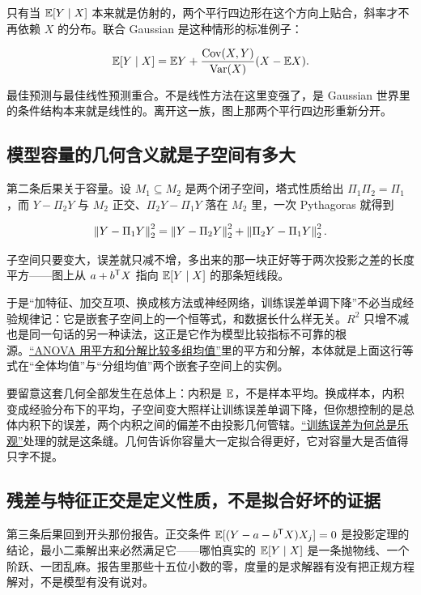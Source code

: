 只有当 \(\mathbb{E}[Y\mid X]\) 本来就是仿射的，两个平行四边形在这个方向上贴合，斜率才不再依赖 \(X\) 的分布。联合 Gaussian 是这种情形的标准例子：

\[
\mathbb{E}[Y\mid X]=\mathbb{E} Y+\frac{\operatorname{Cov}(X,Y)}{\operatorname{Var}(X)}(X-\mathbb{E} X) .
\]

最佳预测与最佳线性预测重合。不是线性方法在这里变强了，是 Gaussian 世界里的条件结构本来就是线性的。离开这一族，图上那两个平行四边形重新分开。

\subsection{模型容量的几何含义就是子空间有多大}

第二条后果关于容量。设 \(M_1\subseteq M_2\) 是两个闭子空间，塔式性质给出 \(\Pi_1\Pi_2=\Pi_1\)，而 \(Y-\Pi_2Y\) 与 \(M_2\) 正交、\(\Pi_2Y-\Pi_1Y\) 落在 \(M_2\) 里，一次 Pythagoras 就得到

\[
\left\lVert Y-\Pi_1Y\right\rVert_2^2=\left\lVert Y-\Pi_2Y\right\rVert_2^2+\left\lVert\Pi_2Y-\Pi_1Y\right\rVert_2^2 .
\]

子空间只要变大，误差就只减不增，多出来的那一块正好等于两次投影之差的长度平方——图上从 \(a+b^{\mathsf{T}}X\) 指向 \(\mathbb{E}[Y\mid X]\) 的那条短线段。

于是``加特征、加交互项、换成核方法或神经网络，训练误差单调下降''不必当成经验规律记：它是嵌套子空间上的一个恒等式，和数据长什么样无关。\(R^2\) 只增不减也是同一句话的另一种读法，这正是它作为模型比较指标不可靠的根源。\hyperref[sec:11-Mathematical-Statistics/08-Regression-and-ANOVA/02]{``ANOVA 用平方和分解比较多组均值''}里的平方和分解，本体就是上面这行等式在``全体均值''与``分组均值''两个嵌套子空间上的实例。

要留意这套几何全部发生在总体上：内积是 \(\mathbb{E}\)，不是样本平均。换成样本，内积变成经验分布下的平均，子空间变大照样让训练误差单调下降，但你想控制的是总体内积下的误差，两个内积之间的偏差不由投影几何管辖。\hyperref[sec:13-Machine-Learning/10-Learning-Theory/01]{``训练误差为何总是乐观''}处理的就是这条缝。几何告诉你容量大一定拟合得更好，它对容量大是否值得只字不提。

\subsection{残差与特征正交是定义性质，不是拟合好坏的证据}

第三条后果回到开头那份报告。正交条件 \(\mathbb{E}[(Y-a-b^{\mathsf{T}}X)X_j]=0\) 是投影定理的结论，最小二乘解出来必然满足它——哪怕真实的 \(\mathbb{E}[Y\mid X]\) 是一条抛物线、一个阶跃、一团乱麻。报告里那些十五位小数的零，度量的是求解器有没有把正规方程解对，不是模型有没有说对。

